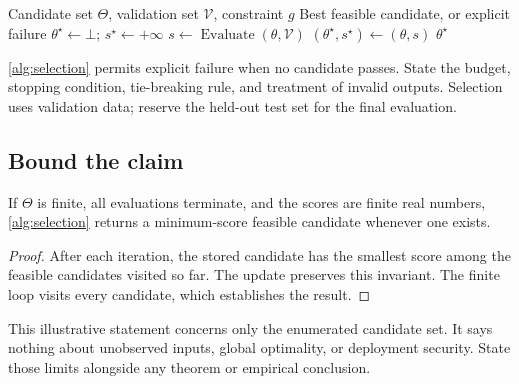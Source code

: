\begin{algorithm}[htbp]
  \caption{Illustrative candidate-selection protocol}
  \label{alg:selection}
  \begin{algorithmic}[1]
    \Require Candidate set $\Theta$, validation set $\mathcal{V}$, constraint $g$
    \Ensure Best feasible candidate, or explicit failure
    \State $\theta^{\star}\gets\bot$; $s^{\star}\gets+\infty$
        \State $s\gets\operatorname{Evaluate}(\theta,\mathcal{V})$
          \State $(\theta^{\star},s^{\star})\gets(\theta,s)$
        \EndIf
      \EndIf
    \EndFor
    \State \Return $\theta^{\star}$
  \end{algorithmic}
\end{algorithm}

\autoref{alg:selection} permits explicit failure when no candidate passes.
State the budget, stopping condition, tie-breaking rule, and treatment of
invalid outputs. Selection uses validation data; reserve the held-out test
set for the final evaluation.

\subsection{Bound the claim}
\begin{proposition}
If $\Theta$ is finite, all evaluations terminate, and the scores are finite
real numbers, \autoref{alg:selection} returns a minimum-score feasible
candidate whenever one exists.
\end{proposition}
\begin{proof}
After each iteration, the stored candidate has the smallest score among
the feasible candidates visited so far. The update preserves this invariant.
The finite loop visits every candidate, which establishes the result.
\end{proof}
This illustrative statement concerns only the enumerated candidate set.
It says nothing about unobserved inputs, global optimality, or deployment
security. State those limits alongside any theorem or empirical conclusion.
